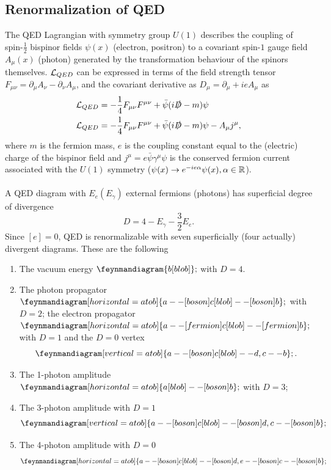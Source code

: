 \subsection{Renormalization of QED}
The QED Lagrangian with symmetry group $U(1)$ describes the coupling of spin-$\frac{1}{2}$ bispinor fields $\psi(x)$ (electron, positron) to a covariant spin-$1$ gauge field $A_{\mu}(x)$ (photon) generated by the transformation behaviour of the spinors themselves. $\mathcal{L}_{QED}$ can be expressed in terms of the field strength tensor $F_{\mu \nu} = \partial_{\mu} A_{\nu} - \partial_{\nu} A_{\mu}$, and the covariant derivative as $D_{\mu} = \partial_{\mu} + i e A_{\mu}$ as
\begin{align}
	\mathcal{L}_{QED} &= - \frac{1}{4} F_{\mu \nu} F^{\mu \nu} + \bar{\psi} (i \slashed{D} - m) \psi \\
	\mathcal{L}_{QED} &= - \frac{1}{4} F_{\mu \nu} F^{\mu \nu}+ \bar{\psi} (i \slashed{D} -m) \psi - A_{\mu}j^{\mu},
\end{align}
where $m$ is the fermion mass, $e$ is the coupling constant equal to the (electric) charge of the bispinor field and $j^{\mu} = e \bar{\psi} \gamma^{\mu} \psi$ is the conserved fermion current associated with the $U(1)$ symmetry ($\psi(x) \rightarrow e^{- i e \alpha} \psi(x), \alpha \in \mathbb{R}$).\\
\\
A QED diagram with $E_e(E_{\gamma})$ external fermions (photons) has superficial degree of divergence
\begin{equation} 
	D = 4- E_{\gamma} - \frac{3}{2} E_e.
\end{equation}
Since $[e]=0$, QED is renormalizable with seven superficially (four actually) divergent diagrams. These are the following
\begin{enumerate}
	\item The vacuum energy $\feynmandiagram{b[blob]};$ with $D=4$.
	\item The photon propagator $\feynmandiagram[horizontal=a to b]{a--[boson] c[blob] -- [boson]b};$ with $D=2$; the electron propagator $\feynmandiagram[horizontal=a to b]{a --[fermion]c[blob] --[fermion]b};$ with $D=1$ and the $D=0$ vertex
	\begin{equation}
		\feynmandiagram[vertical=a to b]{a -- [boson] c [blob] -- d, c--b};.
	\end{equation}
	\item The 1-photon amplitude $\feynmandiagram[horizontal=a to b]{a[blob]--[boson]b};$ with $D=3$;
	\item The 3-photon amplitude with $D=1$
	\begin{equation}
	\feynmandiagram[vertical=a to b]{a -- [boson] c [blob] -- [boson] d, c --[boson] b};
	\end{equation}
	\item The 4-photon amplitude with $D=0$
	\begin{equation}
		\feynmandiagram[horizontal=a to b]{a--[boson] c [blob] -- [boson] d, e --[boson]c--[boson] b};
	\end{equation}
\end{enumerate}
